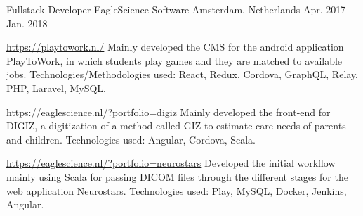 \begin{cventries}
\cventry
{Fullstack Developer} %
{EagleScience Software} %
{Amsterdam, Netherlands} %
{Apr. 2017 - Jan. 2018} %
{
	\begin{cvitems} %
		\item {\url{https://playtowork.nl/}}
			\newline
			Mainly developed the CMS for the android application PlayToWork, in which students play games and they are matched to available jobs.
			\newline
			Technologies/Methodologies used: React, Redux, Cordova, GraphQL, Relay, PHP, Laravel, MySQL.  
		\item {\url{https://eaglescience.nl/?portfolio=digiz} 
			\newline
			Mainly developed the front-end for DIGIZ, a digitization of a method called GIZ to estimate care needs of parents and children.
			\newline
			Technologies used: Angular, Cordova, Scala. }
		\item {\url{https://eaglescience.nl/?portfolio=neurostars}
			\newline
			Developed the initial workflow mainly using Scala for passing DICOM files through the different stages for the web application Neurostars.
			\newline
			Technologies used: Play, MySQL, Docker, Jenkins, Angular.}
	\end{cvitems}
}
\end{cventries}
